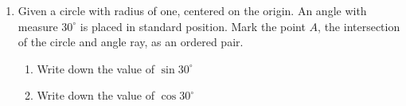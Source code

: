 \documentclass[12pt, twoside]{article}
\begin{document}
\begin{enumerate}
\item Given a circle with radius of one, centered on the origin. An angle with measure $30^\circ$ is placed in standard position. Mark the point $A$, the intersection of the circle and angle ray, as an ordered pair.
    \begin{center}
    \end{center}
    \begin{enumerate}
          \item Write down the value of $\sin{30^\circ}$\\[0.25in]
          \item  Write down the value of $\cos{30^\circ}$\\[0.25in]
    \end{enumerate}
    
    
    

\end{enumerate}
\end{document}
